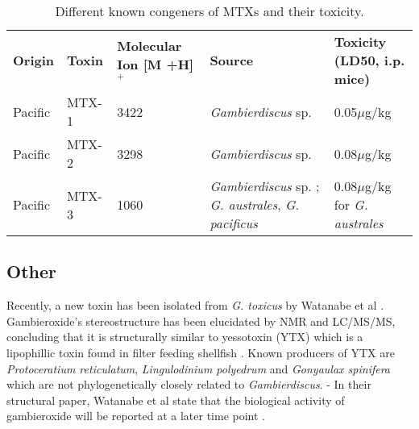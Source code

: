 \documentclass[12pt]{article}
\begin{document}

\begin{table}
\caption{Different known congeners of MTXs and their toxicity.}
\label{tbl:MTXTable}
\begin{tabular}{   p{2cm}  p{2cm}  p{3cm}  p{3cm}  p{4cm}  }
\textbf{Origin} & \textbf{Toxin} & \textbf{Molecular Ion [M +H]$^{+}$} & \textbf{Source} & \textbf{Toxicity (LD50, i.p. mice)} \\
 Pacific & MTX-1 & 3422 \cite{holmes1994purification,murata1993structure} & \emph{Gambierdiscus} sp. \cite{holmes1994purification} & 0.05$\mu$g/kg \cite{murata1993structure}\\
 Pacific & MTX-2 & 3298 \cite{holmes1994purification} & \emph{Gambierdiscus} sp. \cite{holmes1994purification} & 0.08$\mu$g/kg \cite{holmes1994purification}\\
 Pacific & MTX-3 & 1060   \cite{holmes1994purification} & \emph{Gambierdiscus} sp. \cite{holmes1994purification}; \emph{G. australes}, \emph{G. pacificus} \cite{rhodes2014production} &  0.08$\mu$g/kg for \emph{G. australes}  \cite{rhodes2014production} \\
\end{tabular}
\end{table}
\FloatBarrier
\subsection{Other}
Recently, a new toxin has been isolated from \emph{G. toxicus} by Watanabe et al \cite{watanabe2013gambieroxide}. Gambieroxide's stereostructure has been elucidated by NMR and LC/MS/MS, concluding that it is structurally similar to yessotoxin (YTX) which is a lipophillic toxin found in filter feeding shellfish  \cite{tubaro2010yessotoxins}. Known producers of YTX are \emph{Protoceratium reticulatum}, \emph{Lingulodinium polyedrum} and \emph{Gonyaulax spinifera} \cite{tubaro2010yessotoxins} which are not  phylogenetically closely related to \emph{Gambierdiscus}.
- In their structural paper, Watanabe et al state that the biological activity of gambieroxide will be reported at a later time point \cite{watanabe2013gambieroxide}.
\end{document}
